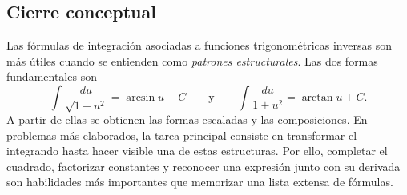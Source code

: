 \subsection{Cierre conceptual}

Las fórmulas de integración asociadas a funciones trigonométricas inversas
son más útiles cuando se entienden como \emph{patrones estructurales}. Las dos
formas fundamentales son
\[
\boxed{\int\frac{du}{\sqrt{1-u^2}}=\arcsin u+C}
\qquad\text{y}\qquad
\boxed{\int\frac{du}{1+u^2}=\arctan u+C.}
\]
A partir de ellas se obtienen las formas escaladas y las composiciones. En
problemas más elaborados, la tarea principal consiste en transformar el
integrando hasta hacer visible una de estas estructuras. Por ello, completar
el cuadrado, factorizar constantes y reconocer una expresión junto con su
derivada son habilidades más importantes que memorizar una lista extensa de
fórmulas.
